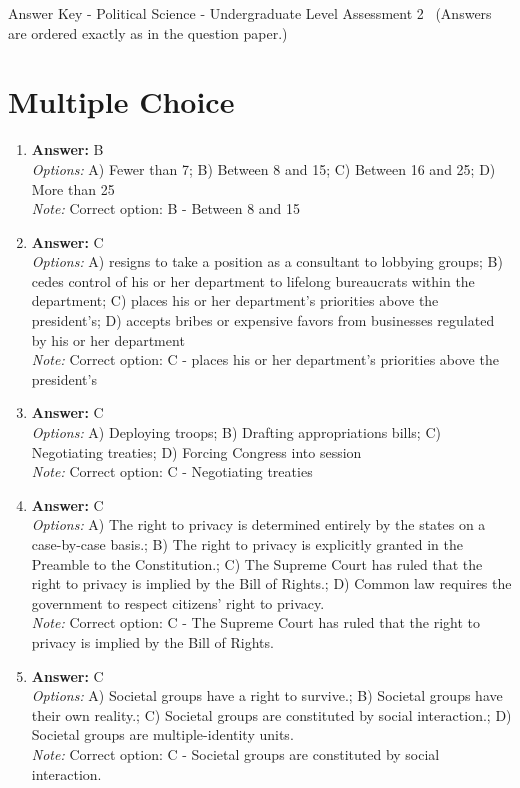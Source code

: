 \documentclass[12pt]{article}
\begin{document}
\begin{center}
Answer Key - Political Science - Undergraduate Level Assessment 2 \
\small (Answers are ordered exactly as in the question paper.)
\end{center}

\section*{Multiple Choice}
\begin{enumerate}[label=\arabic*.]
\item \textbf{Answer:} B
\\ \textit{Options:} A) Fewer than 7; B) Between 8 and 15; C) Between 16 and 25; D) More than 25
\\ \textit{Note:} Correct option: B - Between 8 and 15
\item \textbf{Answer:} C
\\ \textit{Options:} A) resigns to take a position as a consultant to lobbying groups; B) cedes control of his or her department to lifelong bureaucrats within the department; C) places his or her department's priorities above the president's; D) accepts bribes or expensive favors from businesses regulated by his or her department
\\ \textit{Note:} Correct option: C - places his or her department's priorities above the president's
\item \textbf{Answer:} C
\\ \textit{Options:} A) Deploying troops; B) Drafting appropriations bills; C) Negotiating treaties; D) Forcing Congress into session
\\ \textit{Note:} Correct option: C - Negotiating treaties
\item \textbf{Answer:} C
\\ \textit{Options:} A) The right to privacy is determined entirely by the states on a case-by-case basis.; B) The right to privacy is explicitly granted in the Preamble to the Constitution.; C) The Supreme Court has ruled that the right to privacy is implied by the Bill of Rights.; D) Common law requires the government to respect citizens' right to privacy.
\\ \textit{Note:} Correct option: C - The Supreme Court has ruled that the right to privacy is implied by the Bill of Rights.
\item \textbf{Answer:} C
\\ \textit{Options:} A) Societal groups have a right to survive.; B) Societal groups have their own reality.; C) Societal groups are constituted by social interaction.; D) Societal groups are multiple-identity units.
\\ \textit{Note:} Correct option: C - Societal groups are constituted by social interaction.
\end{enumerate}
\end{document}
